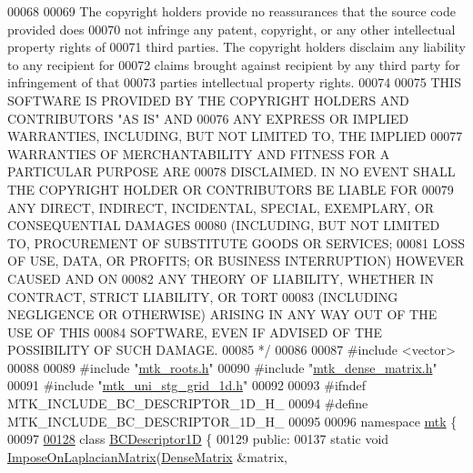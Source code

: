 \begin{DoxyCode}
00068 \textcolor{comment}{}
00069 \textcolor{comment}{The copyright holders provide no reassurances that the source code provided does}
00070 \textcolor{comment}{not infringe any patent, copyright, or any other intellectual property rights of}
00071 \textcolor{comment}{third parties. The copyright holders disclaim any liability to any recipient for}
00072 \textcolor{comment}{claims brought against recipient by any third party for infringement of that}
00073 \textcolor{comment}{parties intellectual property rights.}
00074 \textcolor{comment}{}
00075 \textcolor{comment}{THIS SOFTWARE IS PROVIDED BY THE COPYRIGHT HOLDERS AND CONTRIBUTORS "AS IS" AND}
00076 \textcolor{comment}{ANY EXPRESS OR IMPLIED WARRANTIES, INCLUDING, BUT NOT LIMITED TO, THE IMPLIED}
00077 \textcolor{comment}{WARRANTIES OF MERCHANTABILITY AND FITNESS FOR A PARTICULAR PURPOSE ARE}
00078 \textcolor{comment}{DISCLAIMED. IN NO EVENT SHALL THE COPYRIGHT HOLDER OR CONTRIBUTORS BE LIABLE FOR}
00079 \textcolor{comment}{ANY DIRECT, INDIRECT, INCIDENTAL, SPECIAL, EXEMPLARY, OR CONSEQUENTIAL DAMAGES}
00080 \textcolor{comment}{(INCLUDING, BUT NOT LIMITED TO, PROCUREMENT OF SUBSTITUTE GOODS OR SERVICES;}
00081 \textcolor{comment}{LOSS OF USE, DATA, OR PROFITS; OR BUSINESS INTERRUPTION) HOWEVER CAUSED AND ON}
00082 \textcolor{comment}{ANY THEORY OF LIABILITY, WHETHER IN CONTRACT, STRICT LIABILITY, OR TORT}
00083 \textcolor{comment}{(INCLUDING NEGLIGENCE OR OTHERWISE) ARISING IN ANY WAY OUT OF THE USE OF THIS}
00084 \textcolor{comment}{SOFTWARE, EVEN IF ADVISED OF THE POSSIBILITY OF SUCH DAMAGE.}
00085 \textcolor{comment}{*/}
00086 
00087 \textcolor{preprocessor}{#include <vector>}
00088 
00089 \textcolor{preprocessor}{#include "\hyperlink{mtk__roots_8h}{mtk\_roots.h}"}
00090 \textcolor{preprocessor}{#include "\hyperlink{mtk__dense__matrix_8h}{mtk\_dense\_matrix.h}"}
00091 \textcolor{preprocessor}{#include "\hyperlink{mtk__uni__stg__grid__1d_8h}{mtk\_uni\_stg\_grid\_1d.h}"}
00092 
00093 \textcolor{preprocessor}{#ifndef MTK\_INCLUDE\_BC\_DESCRIPTOR\_1D\_H\_}
00094 \textcolor{preprocessor}{#define MTK\_INCLUDE\_BC\_DESCRIPTOR\_1D\_H\_}
00095 
00096 \textcolor{keyword}{namespace }\hyperlink{namespacemtk}{mtk} \{
00097 
\hypertarget{mtk__robin__bc__descriptor__1d_8h_source_l00128}{}\hyperlink{classmtk_1_1BCDescriptor1D}{00128} \textcolor{keyword}{class }\hyperlink{classmtk_1_1BCDescriptor1D}{BCDescriptor1D} \{
00129  \textcolor{keyword}{public}:
00137   \textcolor{keyword}{static} \textcolor{keywordtype}{void} \hyperlink{classmtk_1_1BCDescriptor1D_a33e51235eaa930e4470f027001a023cf}{ImposeOnLaplacianMatrix}(\hyperlink{classmtk_1_1DenseMatrix}{DenseMatrix} &matrix,

\end{DoxyCode}
